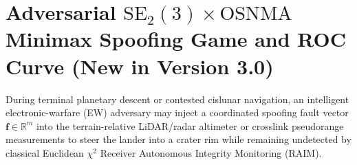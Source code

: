 \documentclass[11pt,a4paper,reqno]{article}
\theoremstyle{definition}
\theoremstyle{remark}
\begin{document}
\section[Adversarial SE2(3) x OSNMA Minimax Spoofing Game and ROC Curve (New in Version 3.0)]{Adversarial $\mathrm{SE}_2(3) \times \mathrm{OSNMA}$ Minimax Spoofing Game and ROC Curve (New in Version 3.0)}

During terminal planetary descent or contested cislunar navigation, an intelligent electronic-warfare (EW) adversary may inject a coordinated spoofing fault vector $\mathbf{f} \in \mathbb{R}^m$ into the terrain-relative LiDAR/radar altimeter or crosslink pseudorange measurements to steer the lander into a crater rim while remaining undetected by classical Euclidean $\chi^2$ Receiver Autonomous Integrity Monitoring (RAIM).
\end{document}
